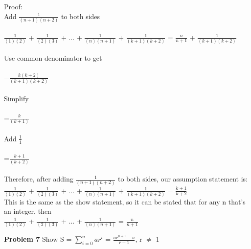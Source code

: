 \documentclass[12pt]{article}
\begin{document}
Proof: \\
	Add $\frac{1}{(n + 1)(n+2)}$ to both sides \\
	\\
	 $\frac{1}{(1)(2)}$ + $\frac{1}{(2)(3)}$ + ... + $\frac{1}{(n)(n+1)}$ + $\frac{1}{(k + 1)(k+2)}$ = $\frac{n}{n+1}$ + $\frac{1}{(k + 1)(k+2)}$\\
	 \\
	 Use common denominator to get\\
	 \\
	 =$\frac{k(k+2)}{(k + 1)(k+2)}$\\
	 \\
	 Simplify \\
	 \\
	 =$\frac{k}{(k + 1)}$\\
	 \\
	 Add $\frac{1}{1}$\\
	 \\
	 =$\frac{k + 1}{(k + 2)}$ \\
	 \\
	 Therefore, after adding $\frac{1}{(n + 1)(n+2)}$ to both sides, our assumption statement is: \\
	 $\frac{1}{(1)(2)}$ + $\frac{1}{(2)(3)}$ + ... + $\frac{1}{(n)(n+1)}$ + $\frac{1}{(k + 1)(k+2)}$ = $\frac{k + 1}{k + 2}$ \\
	 This is the same as the show statement, so it can be stated that for any n that's an integer, then \\
	 $\frac{1}{(1)(2)}$ + $\frac{1}{(2)(3)}$ + ... + $\frac{1}{(n)(n+1)}$ = $\frac{n}{n+1}$ \\



\par

\par
\bigskip
{\bf Problem
7
}
Show S = $\sum\limits_{i = 0}^n ar^{i}$ = $\frac{ar^{n+1} - a}{r - 1}$, r $\neq$ 1
\end{document}
